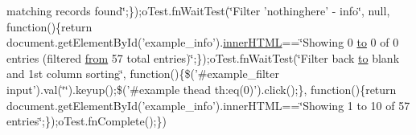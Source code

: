 \begin{DoxyCompactItemize}
matching records found\char`\"{};\});o\+Test.\+fn\+Wait\+Test(\char`\"{}Filter 'nothinghere' -\/ info\char`\"{}, null, function()\{return document.\+get\+Element\+By\+Id('example\+\_\+info').\hyperlink{jquery-ui_8js_a87f73c4f0391c1cf9fe60374a76d9a7b}{inner\+H\+T\+M\+L}==\char`\"{}Showing 0 \hyperlink{jquery-ui_8js_af6086621f45baa2cf538f19e45d3c263}{to} 0 of 0 entries (filtered \hyperlink{jquery-ui_8js_ace03b192fd101a1c5648340bc09b7229}{from} 57 total entries)\char`\"{};\});o\+Test.\+fn\+Wait\+Test(\char`\"{}Filter back \hyperlink{jquery-ui_8js_af6086621f45baa2cf538f19e45d3c263}{to} blank and 1st column sorting\char`\"{}, function()\{\$('\#example\+\_\+filter input').\+val(\char`\"{}\char`\"{}).\+keyup();\$('\#example thead th\+:eq(0)').\+click();\}, function()\{return document.\+get\+Element\+By\+Id('example\+\_\+info').\+inner\+H\+T\+M\+L==\char`\"{}\+Showing 1 to 10 of 57 entries\char`\"{};\});o\+Test.\+fn\+Complete();\})
\end{DoxyCompactItemize}


